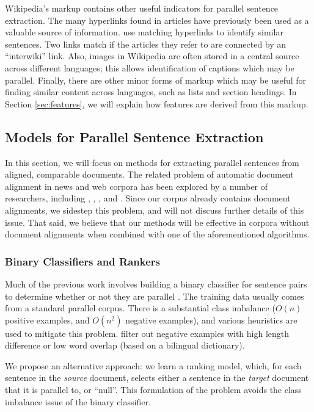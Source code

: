\documentclass[11pt,letterpaper]{article}
\begin{document}
Wikipedia's markup contains other useful indicators for parallel sentence
extraction.  The many hyperlinks found in articles have previously been used as
a valuable source of information.  \cite{Adafre06} use matching
hyperlinks to identify similar sentences.  Two links match if the articles they
refer to are connected by an ``interwiki'' link.
Also, images in Wikipedia are often stored in a central source across
different languages; this allows identification of captions which may be
parallel.  Finally, there are other minor forms
of markup which may be useful for finding similar content across languages, such
as lists and section headings.  In Section \ref{sec:features}, we will explain
how features are derived from this markup.

\subsection{Models for Parallel Sentence Extraction}
\label{sec:models} In this section, we will focus on methods for
extracting parallel sentences from aligned, comparable documents.
The related problem of automatic document alignment in news and
web corpora has been explored by a number of researchers,
including
, ,
, and .
Since our corpus already contains document alignments, we sidestep
this problem, and will not discuss further details of this issue.
That said, we believe that our methods will be effective in
corpora without document alignments when combined with one of the
aforementioned algorithms.


\subsubsection{Binary Classifiers and Rankers}
Much of the previous work involves building a binary classifier for sentence
pairs to determine whether or not they are parallel
\cite{Munteanu05,Tillmann09a}.
The training data usually comes from a standard parallel corpus.  There is a
substantial class imbalance ($O(n)$ positive examples, and $O(n^2)$
negative examples), and various heuristics are used to mitigate this problem.
 filter out negative
examples with high length difference or low word overlap (based on a bilingual
dictionary).

We propose an alternative approach: we learn a ranking model, which, for each sentence in the {\em
source} document, selects either a sentence in the {\em target} document that it is
parallel to, or ``null''.
This formulation of the problem avoids the class imbalance issue of the binary classifier.
\end{document}
